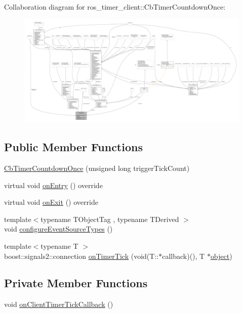 Collaboration diagram for ros\+\_\+timer\+\_\+client\+:\+:Cb\+Timer\+Countdown\+Once\+:
\nopagebreak
\begin{figure}[H]
\begin{center}
\leavevmode
\includegraphics[width=350pt]{classros__timer__client_1_1CbTimerCountdownOnce__coll__graph}
\end{center}
\end{figure}
\subsection*{Public Member Functions}
\begin{DoxyCompactItemize}
\item 
\hyperlink{classros__timer__client_1_1CbTimerCountdownOnce_a11e7697b1f41c26b01132617de3fdf76}{Cb\+Timer\+Countdown\+Once} (unsigned long trigger\+Tick\+Count)
\item 
virtual void \hyperlink{classros__timer__client_1_1CbTimerCountdownOnce_a06e15530538aed6ff5b55e75fe979907}{on\+Entry} () override
\item 
virtual void \hyperlink{classros__timer__client_1_1CbTimerCountdownOnce_af2d3d5b803e19cd843db010d0406503a}{on\+Exit} () override
\item 
{\footnotesize template$<$typename T\+Object\+Tag , typename T\+Derived $>$ }\\void \hyperlink{classros__timer__client_1_1CbTimerCountdownOnce_afe77e4b3a1cb798651426da4a720cff4}{configure\+Event\+Source\+Types} ()
\item 
{\footnotesize template$<$typename T $>$ }\\boost\+::signals2\+::connection \hyperlink{classros__timer__client_1_1CbTimerCountdownOnce_a38949571cf20ca88b4a1bac881399f21}{on\+Timer\+Tick} (void(T\+::$\ast$callback)(), T $\ast$\hyperlink{classobject}{object})
\end{DoxyCompactItemize}
\subsection*{Private Member Functions}
\begin{DoxyCompactItemize}
\item 
void \hyperlink{classros__timer__client_1_1CbTimerCountdownOnce_afe103d54afa6b6e7b89fc65447b69523}{on\+Client\+Timer\+Tick\+Callback} ()
\end{DoxyCompactItemize}
